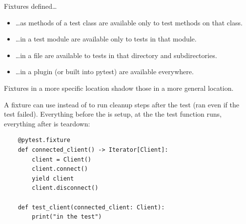


Fixtures defined\ldots{}
\begin{itemize}[itemsep=0pt]
    \item \ldots{}as methods of a test class are available only to test
          methods on that class.
    \item \ldots{}in a test module are available only to tests in that
          module.
    \item \ldots{}in a  file are available to tests in
          that directory and subdirectories.
    \item \ldots{}in a plugin (or built into pytest) are available everywhere.
\end{itemize}

Fixtures in a more specific location shadow those in a more general location.

A fixture can use  instead of 
to run cleanup steps after the test (ran even if the test failed).
Everything before the  is setup,
at the  the test function runs, everything after is teardown:

\begin{verbatim}
    @pytest.fixture
    def connected_client() -> Iterator[Client]:
        client = Client()
        client.connect()
        yield client
        client.disconnect()

    def test_client(connected_client: Client):
        print("in the test")
\end{verbatim}


\pagebreak
